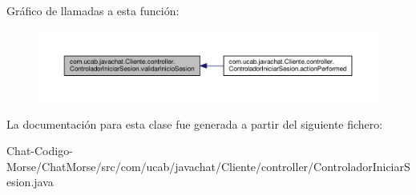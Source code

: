 Gráfico de llamadas a esta función\-:
\nopagebreak
\begin{figure}[H]
\begin{center}
\leavevmode
\includegraphics[width=350pt]{d2/d0e/classcom_1_1ucab_1_1javachat_1_1_cliente_1_1controller_1_1_controlador_iniciar_sesion_a0af254dfeeb830b945c72b3f918c4145_icgraph}
\end{center}
\end{figure}




La documentación para esta clase fue generada a partir del siguiente fichero\-:\begin{DoxyCompactItemize}
\item 
Chat-\/\-Codigo-\/\-Morse/\-Chat\-Morse/src/com/ucab/javachat/\-Cliente/controller/Controlador\-Iniciar\-Sesion.\-java\end{DoxyCompactItemize}
